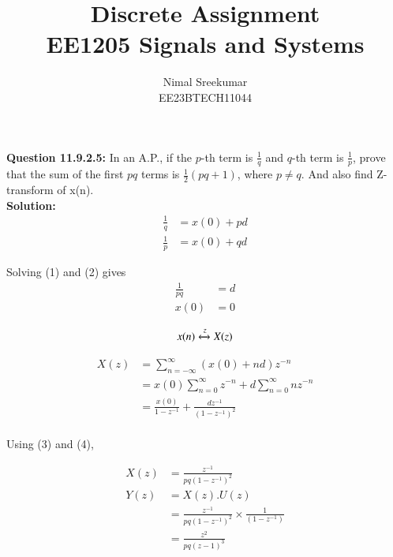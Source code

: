 \documentclass[a4,12pt,twocolumn]{IEEEtran}
\begin{document}
\let\vec\mathbf

\title{
\Huge\textbf{Discrete Assignment}\\
\Huge\textbf{EE1205} Signals and Systems\\
}
\large\author{Nimal Sreekumar\\EE23BTECH11044}

\maketitle



\bigskip

\renewcommand{\thefigure}{\theenumi}
\renewcommand{\thetable}{\theenumi}


\textbf{Question 11.9.2.5:}
In an A.P., if the \(p\)-th term is \(\frac{1}{q}\) and \(q\)-th term is \(\frac{1}{p}\), prove that the sum of the first \(pq\) terms is \(\frac{1}{2}(pq + 1)\), where \(p \neq q\). And also find Z-transform of x(n).\\

\textbf{Solution:}\\
\begin{align}
    \frac{1}{q} &= x(0) + pd \\
    \frac{1}{p} &= x(0) + qd
\end{align}

Solving (1) and (2) gives
\begin{align}
    \frac{1}{pq} &= d\\
    x(0) &= 0
\end{align}

\begin{align}
x(n) \xleftrightarrow z  X(z)
\end{align}

\begin{align}
X(z) &=\sum_{n=-\infty}^{\infty} (x(0) + nd) z^{-n}\\
&= x(0) \sum_{n=0}^{\infty} z^{-n} + d \sum_{n=0}^{\infty}nz^{-n}\\
&= \frac{x(0)}{1-z^{-1}} + \frac{dz^{-1}}{(1-z^{-1})^2}  
\end{align}
\\
Using (3) and (4),

\begin{align}
X(z) &= \frac{z^{-1}}{pq(1-z^{-1})^2}\\
Y(z) &= X(z).U(z) \\
&= \frac{z^{-1}}{pq(1-z^{-1})^2} \times \frac{1}{(1-z^{-1})}\\
&= \frac{z^2}{pq(z-1)^3}
\end{align}\\
\end{document}
